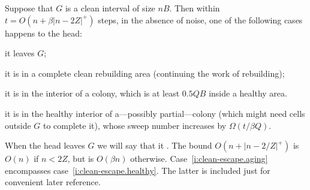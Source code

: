 \documentclass[12pt]{memoir}
\def\B{B}
\def\G{G}
\newcommand{\Q}{Q}
\newcommand{\Z}{Z}
\begin{document}
\begin{lemma}\label{lem:clean-escape}
Suppose that \( \G \) is a clean interval of size \( n\B \).
Then within \( t=O(n+\beta |n-2\Z|^{+}) \) steps, in the absence of noise, one of the following
cases happens to the head:
\begin{Alphenum}
  \item\label{i:clean-escape.leave}  it leaves \( G \);
  \item\label{i:clean-escape.rebuild} it is in a complete clean rebuilding area (continuing the work of rebuilding);
  \item\label{i:clean-escape.healthy} it is in 
the interior of a colony, which is at least \( 0.5\Q\B \) inside a healthy area. 
  \item\label{i:clean-escape.aging} it is in the healthy interior of 
a---possibly partial---colony (which might need cells outside \( G \) to complete it),
whose sweep number increases by \( \Omega(t/\beta\Q) \).
\end{Alphenum}
\end{lemma}
When the head leaves \( \G \) we will say that it .
The bound \( O(n+|n-2/Z|^{+}) \) is \( O(n) \) if \( n<2\Z \), but is \( O(\beta n) \) otherwise.
Case~\eqref{i:clean-escape.aging} encompasses case~\eqref{i:clean-escape.healthy}.
The latter is included just for convenient later reference.
\end{document}
